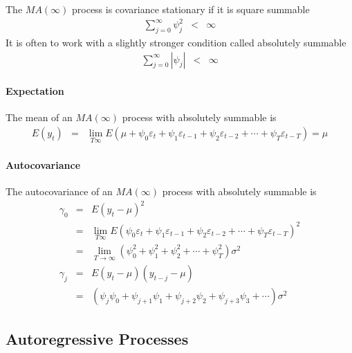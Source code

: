 The $MA(\infty)$ process is covariance stationary if it is square summable
\begin{eqnarray*}
\sum_{j=0}^{\infty}\psi_{j}^{2}&<&\infty
\end{eqnarray*}
It is often to work with a slightly stronger condition called absolutely summable
\begin{eqnarray*}
\sum_{j=0}^{\infty}|\psi_{j}|&<&\infty
\end{eqnarray*}

\paragraph{Expectation}
The mean of an $MA(\infty)$ process with absolutely summable is
\begin{eqnarray*}
E(y_{t})&=&\lim_{T\infty}E(\mu+\psi_{0}\varepsilon_{t}+\psi_{1}\varepsilon_{t-1}+\psi_{2}\varepsilon_{t-2}+\cdots+\psi_{T}\varepsilon_{t-T})=\mu
\end{eqnarray*}

\paragraph{Autocovariance}
The autocovariance of an $MA(\infty)$ process with absolutely summable is
\begin{eqnarray*}
\gamma_{0}&=&E(y_{t}-\mu)^{2}\\
&=&\lim_{T\infty}E(\psi_{0}\varepsilon_{t}+\psi_{1}\varepsilon_{t-1}+\psi_{2}\varepsilon_{t-2}+\cdots+\psi_{T}\varepsilon_{t-T})^{2}\\
&=&\lim_{T\to\infty}(\psi_{0}^{2}+\psi_{1}^{2}+\psi_{2}^{2}+\cdots+\psi_{T}^{2})\sigma^{2}\\
\gamma_{j}&=&E(y_{t}-\mu)(y_{t-j}-\mu)\\
&=&(\psi_{j}\psi_{0}+\psi_{j+1}\psi_{1}+\psi_{j+2}\psi_{2}+\psi_{j+3}\psi_{3}+\cdots)\sigma^{2}
\end{eqnarray*}

\subsection{Autoregressive Processes}

